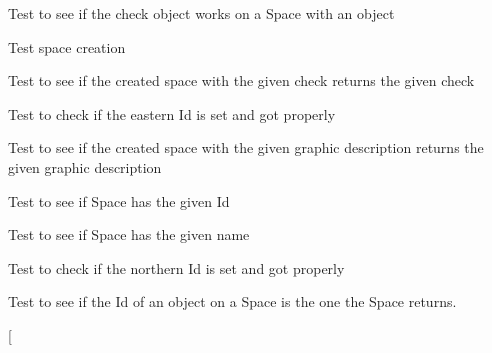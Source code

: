 \begin{DoxyRefList}
\item[\label{test__test000262}%
\hypertarget{test__test000262}{}%
Member \hyperlink{space__test_8h_a6989d8b8621fd8374ae4c0109591943c}{test1\+\_\+space\+\_\+check\+\_\+object} ()]Test to see if the check object works on a Space with an object  
\item[\label{test__test000212}%
\hypertarget{test__test000212}{}%
Member \hyperlink{space__test_8h_a69278cc022dc5688d4725f8d36317b30}{test1\+\_\+space\+\_\+create} ()]Test space creation  
\item[\label{test__test000245}%
\hypertarget{test__test000245}{}%
Member \hyperlink{space__test_8h_aea5055c002d6150e36f79b3ebe48d07d}{test1\+\_\+space\+\_\+get\+\_\+check} ()]Test to see if the created space with the given check returns the given check  
\item[\label{test__test000239}%
\hypertarget{test__test000239}{}%
Member \hyperlink{space__test_8h_a354adb2722b06ec65b7212d2736d6417}{test1\+\_\+space\+\_\+get\+\_\+east} ()]Test to check if the eastern Id is set and got properly  
\item[\label{test__test000243}%
\hypertarget{test__test000243}{}%
Member \hyperlink{space__test_8h_a4279d034f757a350dcaa9604903b179b}{test1\+\_\+space\+\_\+get\+\_\+graphic\+\_\+description} ()]Test to see if the created space with the given graphic description returns the given graphic description  
\item[\label{test__test000233}%
\hypertarget{test__test000233}{}%
Member \hyperlink{space__test_8h_a920df9e02482f4f1e6a5ebcaec523860}{test1\+\_\+space\+\_\+get\+\_\+id} ()]Test to see if Space has the given Id  
\item[\label{test__test000231}%
\hypertarget{test__test000231}{}%
Member \hyperlink{space__test_8h_ad12c42523c517507566c5c68b1527689}{test1\+\_\+space\+\_\+get\+\_\+name} ()]Test to see if Space has the given name  
\item[\label{test__test000235}%
\hypertarget{test__test000235}{}%
Member \hyperlink{space__test_8h_a3a87f1e1e173d622bfbd3bcd14e060ca}{test1\+\_\+space\+\_\+get\+\_\+north} ()]Test to check if the northern Id is set and got properly  
\item[\label{test__test000247}%
\hypertarget{test__test000247}{}%
Member \hyperlink{space__test_8h_ab47960fac6126d77d7b3d163177bbd4f}{test1\+\_\+space\+\_\+get\+\_\+object\+\_\+id} ()]Test to see if the Id of an object on a Space is the one the Space returns.  
\item[\label{test__test000249}%
\hypertarget{test__test000249}{}%

\end{DoxyRefList}
